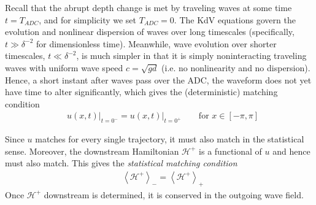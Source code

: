 \documentclass[11pt]{article}
\newcommand{\mean}[1]{\left< #1 \right>}
\newcommand{\depth}{d}
\newcommand{\Ham}{\mathcal{H}}
\newcommand{\Hdn}{\Ham^{+}}
\newcommand{\meanup}[1]{\mean{#1}_{-}}
\newcommand{\meandn}[1]{\mean{#1}_{+}}
\begin{document}
Recall that the abrupt depth change is met by traveling waves at some time $t = T_{ADC}$, and for simplicity we set $T_{ADC} = 0$. The KdV equations govern the evolution and nonlinear dispersion of waves over long timescales (specifically, $t \gg \delta^{-2}$ for dimensionless time). Meanwhile, wave evolution over shorter timescales, $t \ll \delta^{-2}$, is much simpler in that it is simply noninteracting traveling waves with uniform wave speed $c = \sqrt{g \depth}$ (i.e. no nonlinearity and no dispersion). Hence, a short instant after waves pass over the ADC, the waveform does not yet have time to alter significantly, which gives the (deterministic) matching condition
\begin{align}
&u(x,t) \vert_{t=0^-} = u(x,t) \vert_{t=0^+} \qquad \text{for } x \in [-\pi, \pi]
\end{align}

Since $u$ matches for every single trajectory, it must also match in the statistical sense. Moreover, the downstream Hamiltonian $\Hdn$ is a functional of $u$ and hence must also match. This gives the {\em statistical matching condition}
\begin{align}
\label{statmatch}
&\meanup{\Hdn} = \meandn{\Hdn}
\end{align}
Once $\Hdn$ downstream is determined, it is conserved in the outgoing wave field.

\end{document}
